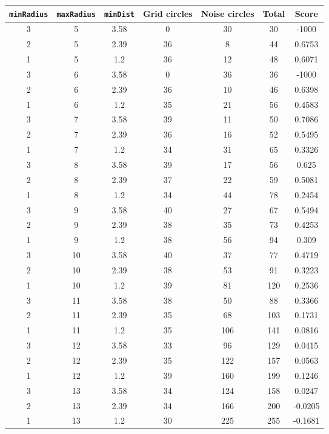 \documentclass[letterpaper, 12pt]{article}
\begin{document}
\begin{longtable}{|c|c|c|c|c|c|c|}
\hline
\textbf{\texttt{minRadius}} & \textbf{\texttt{maxRadius}} & \textbf{\texttt{minDist}} & \textbf{Grid circles} & \textbf{Noise circles} & \textbf{Total} & \textbf{Score} \\
\hline
3 & 5 & 3.58 & 0 & 30 & 30 & -1000 \\
\hline
2 & 5 & 2.39 & 36 & 8 & 44 & 0.6753 \\
\hline
1 & 5 & 1.2 & 36 & 12 & 48 & 0.6071 \\
\hline
3 & 6 & 3.58 & 0 & 36 & 36 & -1000 \\
\hline
2 & 6 & 2.39 & 36 & 10 & 46 & 0.6398 \\
\hline
1 & 6 & 1.2 & 35 & 21 & 56 & 0.4583 \\
\hline
3 & 7 & 3.58 & 39 & 11 & 50 & 0.7086 \\
\hline
2 & 7 & 2.39 & 36 & 16 & 52 & 0.5495 \\
\hline
1 & 7 & 1.2 & 34 & 31 & 65 & 0.3326 \\
\hline
3 & 8 & 3.58 & 39 & 17 & 56 & 0.625 \\
\hline
2 & 8 & 2.39 & 37 & 22 & 59 & 0.5081 \\
\hline
1 & 8 & 1.2 & 34 & 44 & 78 & 0.2454 \\
\hline
3 & 9 & 3.58 & 40 & 27 & 67 & 0.5494 \\
\hline
2 & 9 & 2.39 & 38 & 35 & 73 & 0.4253 \\
\hline
1 & 9 & 1.2 & 38 & 56 & 94 & 0.309 \\
\hline
3 & 10 & 3.58 & 40 & 37 & 77 & 0.4719 \\
\hline
2 & 10 & 2.39 & 38 & 53 & 91 & 0.3223 \\
\hline
1 & 10 & 1.2 & 39 & 81 & 120 & 0.2536 \\
\hline
3 & 11 & 3.58 & 38 & 50 & 88 & 0.3366 \\
\hline
2 & 11 & 2.39 & 35 & 68 & 103 & 0.1731 \\
\hline
1 & 11 & 1.2 & 35 & 106 & 141 & 0.0816 \\
\hline
3 & 12 & 3.58 & 33 & 96 & 129 & 0.0415 \\
\hline
2 & 12 & 2.39 & 35 & 122 & 157 & 0.0563 \\
\hline
1 & 12 & 1.2 & 39 & 160 & 199 & 0.1246 \\
\hline
3 & 13 & 3.58 & 34 & 124 & 158 & 0.0247 \\
\hline
2 & 13 & 2.39 & 34 & 166 & 200 & -0.0205 \\
\hline
1 & 13 & 1.2 & 30 & 225 & 255 & -0.1681 \\

\end{longtable}
\end{document}
